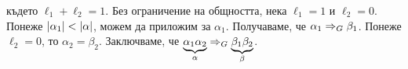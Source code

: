 \begin{extra}
\begin{hint}
\begin{itemize}
\begin{prooftree}
      \end{prooftree}
    \end{itemize}
    където $\ell_1 + \ell_2 = 1$.
    Без ограничение на общността, нека $\ell_1 = 1$ и $\ell_2 = 0$. Понеже $\abs{\alpha_1} < \abs{\alpha}$, можем да приложим \IndHyp
    за $\alpha_1$. Получаваме, че $\alpha_1 \derive{}_G \beta_1$. Понеже $\ell_2 = 0$, то $\alpha_2 = \beta_2$.
    Заключваме, че $\underbrace{\alpha_1\alpha_2}_{\alpha} \derive{}_G \underbrace{\beta_1\beta_2}_{\beta}$.
  \end{hint}
\end{extra}


